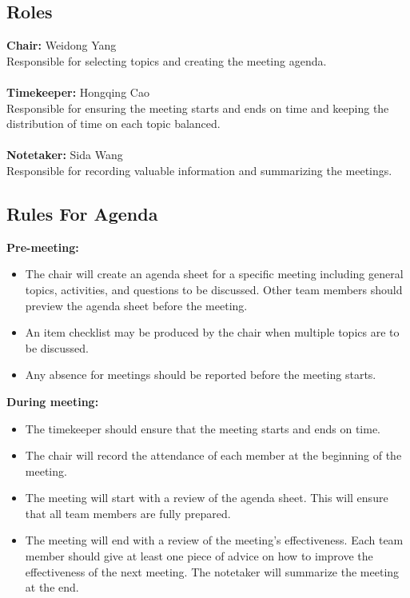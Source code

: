 \documentclass{article}
\begin{document}
\subsection{Roles}
\textbf{Chair:} Weidong Yang\\
Responsible for selecting topics and creating the meeting agenda. \\\\
\textbf{Timekeeper:} Hongqing Cao\\
Responsible for ensuring the meeting starts and ends on time and keeping the distribution of time on each topic balanced.\\\\
\textbf{Notetaker:} Sida Wang\\
Responsible for recording valuable information and summarizing the meetings.\\

\subsection{Rules For Agenda}
\textbf{Pre-meeting:}
\begin{itemize}
	\item The chair will create an agenda sheet for a specific meeting including general topics, activities, and questions to be discussed. Other team members should preview the agenda sheet before the meeting.
	\item An item checklist may be produced by the chair when multiple topics are to be discussed.
	\item Any absence for meetings should be reported before the meeting starts.
\end{itemize}
\textbf{During meeting:}
\begin{itemize}
	\item The timekeeper should ensure that the meeting starts and ends on time.
	\item The chair will record the attendance of each member at the beginning of the meeting. 
	\item The meeting will start with a review of the agenda sheet. This will ensure that all team members are fully prepared.
	\item The meeting will end with a review of the meeting's effectiveness. Each team member should give at least one piece of advice on how to improve the effectiveness of the next meeting. The notetaker will summarize the meeting at the end.
\end{itemize}
\end{document}
